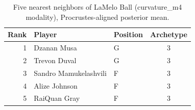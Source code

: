 \begin{table}[htbp]
  \centering\small
  \begin{tabular}{rllc}
    \toprule
    Rank & Player & Position & Archetype \\
    \midrule
    1 & Dzanan Musa & G & 3 \\
    2 & Trevon Duval & G & 3 \\
    3 & Sandro Mamukelashvili & F & 3 \\
    4 & Alize Johnson & F & 3 \\
    5 & RaiQuan Gray & F & 3 \\
    \bottomrule
  \end{tabular}
  \caption{Five nearest neighbors of LaMelo Ball (curvature_m4 modality), Procrustes-aligned posterior mean.}
  \label{tab:LaMelo_Ball_neighbors_curvature_m4}
\end{table}

